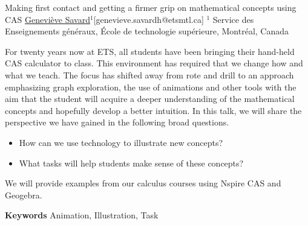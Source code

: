 


\begin{abstract_online}{Making first contact and getting a firmer grip on mathematical concepts using CAS}{%
        \underline{Geneviève Savard}$^{1}$}{[genevieve.savardh@etsmtl.ca]
        }{%
        $^1$ Service des Enseignements généraux, École de technologie supérieure, Montréal, Canada}
    

For twenty years now at ETS, all students have been bringing their hand-held CAS calculator to class. This environment has required that we change how and what we teach. The focus has shifted away from rote and drill to an approach emphasizing graph exploration, the use of animations and other tools with the aim that the student will acquire a deeper understanding of the mathematical concepts and hopefully develop a better intuition. 
In this talk, we will share the perspective we have gained in the following broad questions. 

\begin{itemize}
	\item How can we use technology to illustrate new concepts? 
  \item What tasks will help students make sense of these concepts? 
\end{itemize}
We will provide examples from our calculus courses using Nspire CAS and Geogebra.


\textbf{Keywords} \newline{} Animation, Illustration, Task

\end{abstract_online}
    